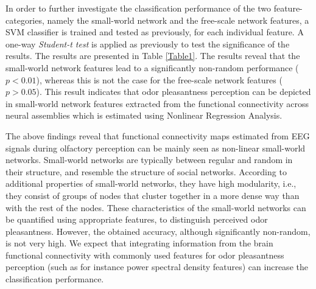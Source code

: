 %
%

In order to further investigate the classification performance of the two feature-categories, namely the small-world network and the free-scale network features, a SVM classifier is trained and tested as previously, for each individual feature. A one-way \emph{Student-t test} is applied as previously to test the significance of the results. The results are presented in Table \ref{Table1}. The results reveal that the small-world network features lead to a significantly non-random performance ($p<0.01$), whereas this is not the case for the free-scale network features ($p>0.05$). This result indicates that odor pleasantness perception can be depicted in small-world network features extracted from the functional connectivity across neural assemblies which is estimated using Nonlinear Regression Analysis. 

The above findings reveal that functional connectivity maps estimated from EEG signals during olfactory perception can be mainly seen as non-linear small-world networks. Small-world networks are typically between regular and random in their structure, and resemble the structure of social networks. According to additional properties of small-world networks, they have high modularity, i.e., they consist of groups of nodes that cluster together in a more dense way than with the rest of the nodes. These characteristics of the small-world networks can be quantified using appropriate features, to distinguish perceived odor pleasantness. However, the obtained accuracy, although significantly non-random, is not very high. We expect that integrating information from the brain functional connectivity with commonly used features for odor pleasantness perception (such as for instance power spectral density features) can increase the classification performance. 

